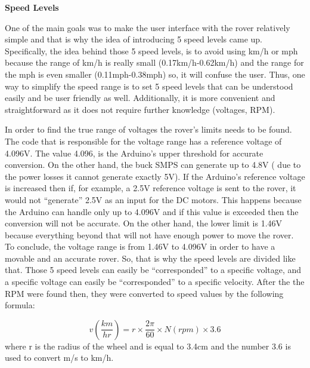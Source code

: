 \documentclass[a4paper]{article}
\begin{document}

\textbf{Speed Levels}

One of the main goals was to make the user interface with the rover relatively 
simple and that is why the idea of introducing 5 speed levels came up. 
Specifically, the idea behind those 5 speed levels, is to avoid using km/h or 
mph because the range of km/h is really small (0.17km/h-0.62km/h) and the range 
for the mph is even smaller (0.11mph-0.38mph) so, it will confuse the user. Thus,
one way to simplify the speed range is to set 5 speed levels that can be 
understood easily and be user friendly as well. Additionally, it is more 
convenient and straightforward as it does not require further knowledge 
(voltages, RPM).

In order to find the true range of voltages the rover's limits needs to be found. 
The code that is responsible for the voltage range has a reference voltage of 
4.096V. The value 4.096, is the Arduino's upper threshold for accurate 
conversion. On the other hand, the buck SMPS can generate up to 4.8V 
( due to the power losses it cannot generate exactly 5V). If the Arduino's 
reference voltage is increased then if, for example, a 2.5V reference voltage 
is sent to the rover, it  would not ``generate'' 2.5V as an input for the 
DC motors. This happens because the Arduino can handle only up to 4.096V and 
if this value is exceeded then the conversion will not be accurate. On the other 
hand, the lower limit is 1.46V because everything beyond that will not have enough 
power to move the rover. To conclude, the voltage range is from 1.46V to 4.096V in 
order to have a movable and an accurate rover. So, that is why the speed levels 
are divided like that. Those 5 speed levels can easily be ``corresponded'' to a 
specific voltage, and a specific voltage can easily be ``corresponded'' to a 
specific velocity.  After the the RPM were found then, they were converted to 
speed values by the following formula:

$$ v \left(\frac{km}{hr}\right) = r \times \frac{2\pi}{60} \times N \left( rpm \right) \times 3.6  $$
where r is the radius of the wheel and is equal to 3.4cm and the number 3.6 is used to convert m/s to km/h. 



\end{document}
